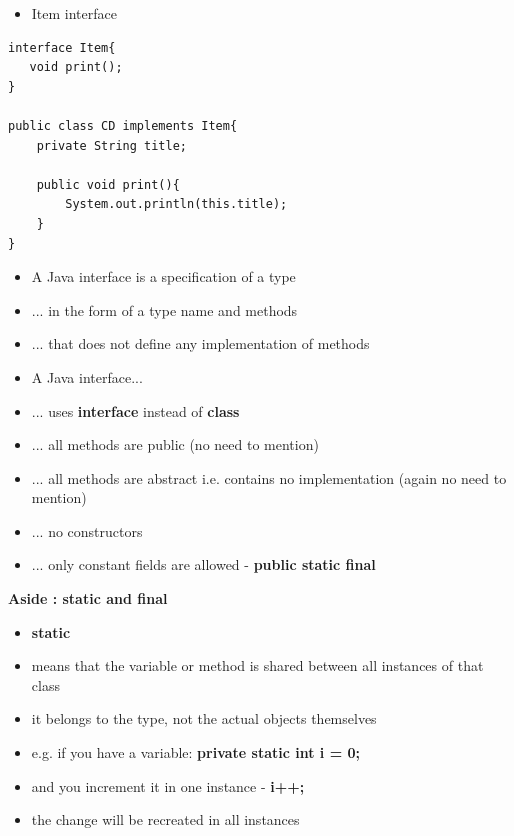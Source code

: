 \documentclass{beamer}
\begin{document}
\begin{frame}[fragile]
\begin{itemize}
\item Item interface
\end{itemize}
\begin{block}{}
\begin{lstlisting}
interface Item{   
   void print();
}

public class CD implements Item{
    private String title;
    
    public void print(){
        System.out.println(this.title);
    }
}
\end{lstlisting}
\end{block}
\end{frame}

\begin{frame}
\begin{itemize}
\item A Java interface is a specification of a type 
\item ... in the form of a type name and methods 
\item ... that does not define any implementation of methods
\bigskip
\end{itemize}
\end{frame}

\begin{frame}
\begin{itemize}
\item A Java interface...
\item ... uses \textbf{interface} instead of \textbf{class}
\item ... all methods are public (no need to mention)
\item ... all methods are abstract i.e. contains no implementation \newline (again no need to mention)
\item ... no constructors
\item ... only constant fields are allowed - \textbf{public static final}
\end{itemize}
\end{frame}

\begin{frame}
\begin{center}
\textbf{Aside : static and final}
\end{center}
\begin{itemize}
\item \textbf{static}
\bigskip 
\item means that the variable or method is shared between all instances of that class
\item it belongs to the type, not the actual objects themselves
\item e.g.  if you have a variable:  \textbf{private static int i = 0;}
\item and you increment it in one instance - \textbf{i++;} 
\item the change will be recreated in all instances
\end{itemize}
\end{frame}
\end{document}
